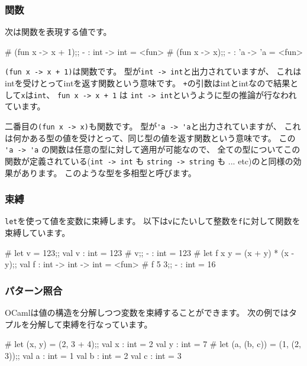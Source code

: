 \documentclass[mingoth,a4paper]{jsarticle}
\begin{document}
\subsubsection{関数}

次は関数を表現する値です。

\begin{commandline}
# (fun x -> x + 1);;
- : int -> int = <fun>
# (fun x -> x);;
- : 'a -> 'a = <fun>
\end{commandline}

\verb|(fun x -> x + 1)|は関数です。
型が\verb|int -> int|と出力されていますが、
これはintを受けとってintを返す関数という意味です。
\verb|+|の引数はintとintなので結果として\verb|x|は\verb|int|、
\verb|fun x -> x + 1| は \verb|int -> int|というように型の推論が行なわれています。

二番目の\verb|(fun x -> x)|も関数です。
型が\verb|'a -> 'a|と出力されていますが、
これは何かある型の値を受けとって、同じ型の値を返す関数という意味です。
この \verb|'a -> 'a| の関数は任意の型に対して適用が可能なので、
全ての型についてこの関数が定義されている(\verb|int -> int| も \verb|string -> string| も ... etc)のと同様の効果があります。
このような型を多相型と呼びます。

\subsubsection{束縛}

\verb|let|を使って値を変数に束縛します。
以下は\verb|v|にたいして整数を\verb|f|に対して関数を束縛しています。

\begin{commandline}
# let v = 123;;
val v : int = 123
# v;;
- : int = 123
# let f x y = (x + y) * (x - y);;
val f : int -> int -> int = <fun>
# f 5 3;;
- : int = 16
\end{commandline}

\subsubsection{パターン照合}

OCamlは値の構造を分解しつつ変数を束縛することができます。
次の例ではタプルを分解して束縛を行なっています。

\begin{commandline}
# let (x, y) = (2, 3 + 4);;
val x : int = 2
val y : int = 7
# let (a, (b, c)) = (1, (2, 3));;
val a : int = 1
val b : int = 2
val c : int = 3
\end{commandline}
\end{document}
